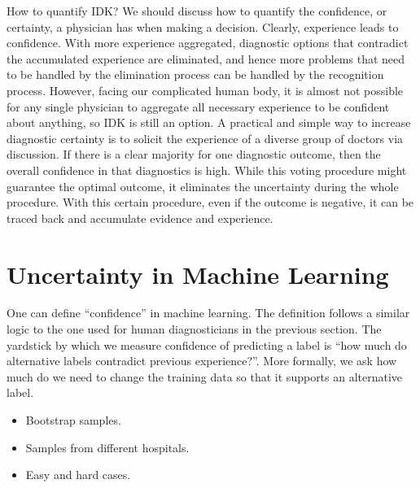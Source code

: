 \documentclass[11pt]{pnas-new}
\begin{document}

How to quantify IDK? We should discuss how to quantify the confidence, or certainty, a physician has when making a decision. 
Clearly, experience leads to confidence. With more experience aggregated, diagnostic options that contradict the accumulated
  experience are eliminated, and hence more problems that need to be handled by the elimination process can be handled by the recognition process. However, facing our complicated human body, it is almost not possible for any single physician to aggregate all necessary experience to be confident about anything, so IDK is still an option. A practical and simple way to increase diagnostic certainty is to solicit the experience of a diverse group of doctors via discussion. If there is a clear majority for one diagnostic outcome,
      then the overall confidence in that diagnostics is high. While this voting procedure might guarantee the optimal outcome, it eliminates the uncertainty during the whole procedure. With this certain procedure, even if the outcome is negative, it can be traced back and accumulate evidence and experience. 

\section{Uncertainty in Machine Learning}

One can define ``confidence'' in machine learning. The definition follows a
similar logic to the one used for human diagnosticians in the previous
section. The yardstick by which we measure confidence of predicting a
label is ``how much do alternative labels contradict previous
experience?''.
More formally, we ask how much do we need to change the training data
so that it supports an alternative label.

\begin{itemize}
  \item Bootstrap samples.
  \item Samples from different hospitals.
  \item Easy and hard cases.
  \end{itemize}
\end{document}
